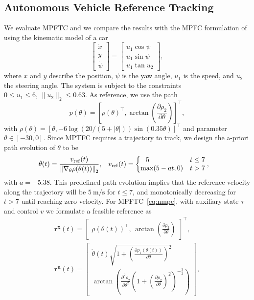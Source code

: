\documentclass[journal]{IEEEtran}
\newcommand {\matr}[2]{\left[\begin{array}{#1}#2\end{array}\right]}
\newcommand{\x}{{\mathbf{x}}}
\renewcommand{\u}{{\mathbf{u}}}
\renewcommand{\r}{{\mathbf{r}}}
\newcommand{\review}[1]{#1}
\begin{document}
	\subsection{Autonomous Vehicle Reference Tracking}
	We evaluate MPFTC and we compare the results with the MPFC formulation of~\cite{Faulwasser2009} using the kinematic model of a car
	\begin{equation}\label{eq:robot_system}
	\matr{c}{\dot{x}\\\dot{y}\\\dot\psi} = \matr{c}{u_1\cos\psi\\u_1\sin\psi\\u_1\tan{}u_2},
	\end{equation}
	where $x$ and $y$ describe the position, $\psi$ is the yaw angle, $u_1$ is the speed, and $u_2$ the steering angle. The system is subject to the constraints $0\leq{}u_1\leq{}6,\,\|u_2\|_2\leq{}0.63$.
	As reference, we use the path 
	\begin{equation}
	p(\theta) = \left [\rho(\theta)^\top,\arctan\left (\frac{\partial\rho_2}{\partial\theta}\right )\right ]^\top,
	\end{equation}
	\review{with $\rho(\theta)=\left[ \theta,-6\log(20/(5+|	\theta|))\sin(0.35\theta)\right ]^\top$} and parameter $\theta\in[-30,0]$. 
	Since MPTFC requires a trajectory to track, we design the a-priori path evolution of $\theta$ to be
	\begin{align*}
	\dot{\theta}(t) &= \frac{v_\mathrm{ref}(t) }{\left \| \nabla_\theta \rho(\theta(t))\right \|_2}, && v_\mathrm{ref}(t) = \left \{ 
	\begin{array}{@{}ll@{}}
	\phantom{-}5 & t\leq{}7\\
	\max(5-a t,0) & t>7
	\end{array}
	\right . ,
	\end{align*}
	with $a=-5.38$. This predefined path evolution implies that the  reference velocity along the trajectory will be $5 \ \mathrm{m/s}$ for $t\leq{}7$, and monotonically decreasing for $t>7$ until reaching zero velocity.
	For MPFTC~\eqref{eq:nmpc}, with auxiliary state $\tau$ and control $v$ we formulate a feasible reference as
	\begin{gather}
	\r^\x(t) = \matr{c}{\rho(\theta(t))^\top,\, \arctan\left (\frac{\partial\rho_2}{\partial\theta}\right ) }^\top,\\
	\r^\u(t) = \matr{c}{\dot{\theta}(t)\sqrt{1+\left (\frac{\partial\rho_1(\theta(t))}{\partial\theta}\right )^2}\\
		\arctan\left (\frac{\partial^2\rho_2}{\partial\theta^2}\left (1+\left (\frac{\partial\rho_2}{\partial\theta}\right )^2\right )^{-\frac{3}{2}}\right )
	},
	\end{gather}
\end{document}

